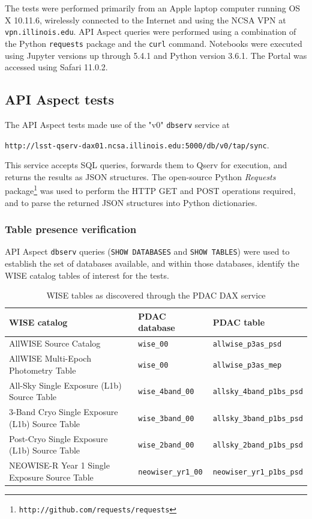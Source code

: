 \documentclass[DM,lsstdraft,STR,toc]{lsstdoc}
\begin{document}
The tests were performed primarily from an Apple laptop computer running OS X 10.11.6, wirelessly connected to the Internet and using the NCSA VPN at \texttt{vpn.illinois.edu}.
API Aspect queries were performed using a combination of the Python \texttt{requests} package and the \texttt{curl} command.
Notebooks were executed using Jupyter versions up through 5.4.1 and Python version 3.6.1.
The Portal was accessed using Safari 11.0.2.

\subsection{API Aspect tests}

The API Aspect tests made use of the "v0" \texttt{dbserv} service at 

\begin{center}
\texttt{http://lsst-qserv-dax01.ncsa.illinois.edu:5000/db/v0/tap/sync}.
\end{center}

This service accepts SQL queries, forwards them to Qserv for execution, and returns the results as JSON structures.
The open-source Python \emph{Requests} package\footnote{\texttt{http://github.com/requests/requests}} was used to perform the HTTP GET and POST operations required, and to parse the returned JSON structures into Python dictionaries.

\subsubsection{Table presence verification}
\label{sect:lsp-00-00-api-tables}

API Aspect \verb|dbserv| queries (\texttt{SHOW DATABASES} and \texttt{SHOW TABLES}) were used to establish the set of databases available, and within those databases, identify the WISE catalog tables of interest for the tests.

\begin{table}[h]
\centering
\begin{tabular}{p{} l l}
WISE catalog & PDAC database & PDAC table \\ \hline
AllWISE Source Catalog & \verb|wise_00| & \verb|allwise_p3as_psd| \\
AllWISE Multi-Epoch Photometry Table & \verb|wise_00| & \verb|allwise_p3as_mep| \\
All-Sky Single Exposure (L1b) Source Table & \verb|wise_4band_00| & \verb|allsky_4band_p1bs_psd| \\
3-Band Cryo Single Exposure (L1b) Source Table & \verb|wise_3band_00| & \verb|allsky_3band_p1bs_psd| \\
Post-Cryo Single Exposure (L1b) Source Table & \verb|wise_2band_00| & \verb|allsky_2band_p1bs_psd| \\
NEOWISE-R Year 1 Single Exposure Source Table & \verb|neowiser_yr1_00| & \verb|neowiser_yr1_p1bs_psd| \\
\end{tabular}
\caption{WISE tables as discovered through the PDAC DAX service}
\label{tab:wisetables}
\end{table}
\end{document}
